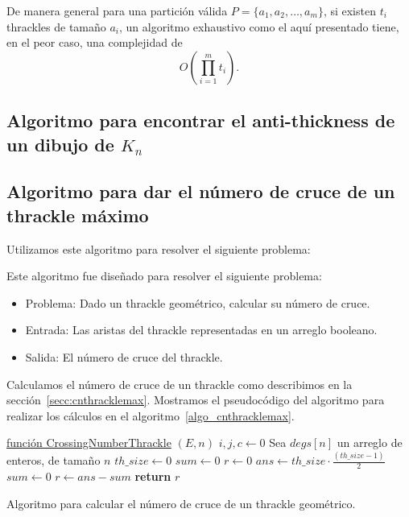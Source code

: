   De manera general para una partición válida $P=\{a_1,a_2,\dots,a_m\}$, si existen $t_i$
  thrackles de tamaño $a_i$, un algoritmo exhaustivo como el aquí presentado tiene, en el
  peor caso, una complejidad de \[O\left(\prod_{i=1}^m t_i\right). \]

\subsection{Algoritmo para encontrar el anti-thickness de un dibujo de
$K_n$}\label{secc:anti-thickness-dibujo}
\subsection{Algoritmo para dar el número de cruce de un thrackle máximo}
\label{secc:algo_cnthracklemax}
Utilizamos este algoritmo para resolver el siguiente problema:

Este algoritmo fue diseñado para resolver el siguiente problema:
\begin{itemize}
  \item[] Problema: Dado un thrackle geométrico, calcular su número de cruce.
  \item[] Entrada: Las aristas del thrackle representadas en un arreglo booleano.
  \item[] Salida: El número de cruce del thrackle.
\end{itemize}

Calculamos el número de cruce de un thrackle como describimos en la sección~\ref{secc:cnthracklemax}. Mostramos el pseudocódigo del algoritmo para realizar los cálculos en el algoritmo~\ref{algo_cnthracklemax}.

\begin{algorithm}[H]
  \DontPrintSemicolon
  \underline{función CrossingNumberThrackle} $(E,n)$\;
   $i,j,c \gets 0$\;
   Sea $degs[n]$ un arreglo de enteros, de tamaño $n$\;
   $th\_size \gets 0$\;
   $sum \gets 0$\;
   $r \gets 0$\;
   $ans \gets th\_size\cdot \frac{(th\_size-1)}{2}$\;
   $sum \gets 0$\;
   $r \gets ans-sum$\;
   \textbf{return} $r$\;
  \caption{Algoritmo para calcular el número de cruce de un thrackle geométrico.}
  \label{algo_cnthracklemax}
\end{algorithm}

